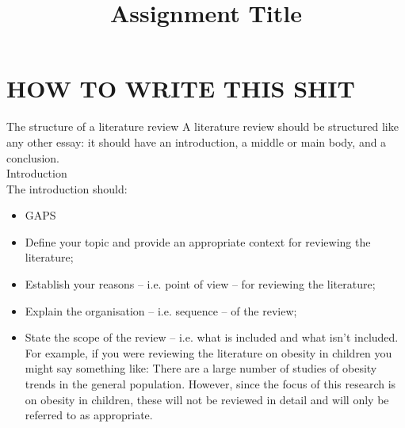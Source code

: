 \documentclass[fleqn,10pt]{wlscirep}
\title{Assignment Title}
\author{}
\begin{document}




\flushbottom
\maketitle
\tableofcontents
\newpage

\section{HOW TO WRITE THIS SHIT}
The structure of a literature review
A literature review should be structured like any other essay: it should have an introduction, a middle or main body, and a conclusion.
\\Introduction
\\The introduction should:
\begin{itemize}
    \item GAPS
    \item Define your topic and provide an appropriate context for reviewing the literature;
    \item Establish your reasons – i.e. point of view – for reviewing the literature;
    \item Explain the organisation – i.e. sequence – of the review;
    \item State the scope of the review – i.e. what is included and what isn’t included. For example, if you were reviewing the literature on obesity in children you might say something like: There are a large number of studies of obesity trends in the general population. However, since the focus of this research is on obesity in children, these will not be reviewed in detail and will only be referred to as appropriate.
\end{itemize}
\end{document}
